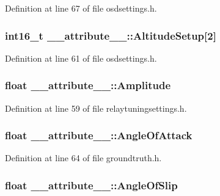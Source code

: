 \-Definition at line 67 of file osdsettings.\-h.

\hypertarget{struct____attribute_____aafb4491ec7da3238bd095bf54b246056}{
\subsubsection[{\-Altitude\-Setup}]{\setlength{\rightskip}{0pt plus 5cm}int16\-\_\-t {\bf \-\_\-\-\_\-attribute\-\_\-\-\_\-\-::\-Altitude\-Setup}\mbox{[}2\mbox{]}}}\label{struct____attribute_____aafb4491ec7da3238bd095bf54b246056}


\-Definition at line 61 of file osdsettings.\-h.

\hypertarget{struct____attribute_____a186af0f787f2e2596ce916832706b641}{
\subsubsection[{\-Amplitude}]{\setlength{\rightskip}{0pt plus 5cm}float {\bf \-\_\-\-\_\-attribute\-\_\-\-\_\-\-::\-Amplitude}}}\label{struct____attribute_____a186af0f787f2e2596ce916832706b641}


\-Definition at line 59 of file relaytuningsettings.\-h.

\hypertarget{struct____attribute_____a21d58f5dc6c63e6492e39a70a6b11eee}{
\subsubsection[{\-Angle\-Of\-Attack}]{\setlength{\rightskip}{0pt plus 5cm}float {\bf \-\_\-\-\_\-attribute\-\_\-\-\_\-\-::\-Angle\-Of\-Attack}}}\label{struct____attribute_____a21d58f5dc6c63e6492e39a70a6b11eee}


\-Definition at line 64 of file groundtruth.\-h.

\hypertarget{struct____attribute_____a2bf77984a5026b4bc33cd3dcdbdd6a18}{
\subsubsection[{\-Angle\-Of\-Slip}]{\setlength{\rightskip}{0pt plus 5cm}float {\bf \-\_\-\-\_\-attribute\-\_\-\-\_\-\-::\-Angle\-Of\-Slip}}}\label{struct____attribute_____a2bf77984a5026b4bc33cd3dcdbdd6a18}


